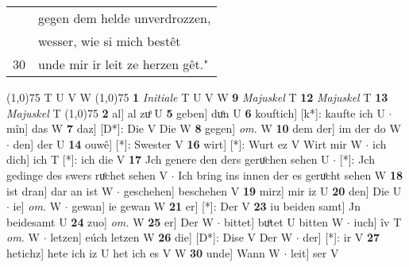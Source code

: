 \documentclass[8pt,a4paper,notitlepage]{article}
\begin{document}
\begin{table}[ht]
\begin{minipage}[t]{0.5\linewidth}
\begin{tabular}{rl}
 & gegen dem helde unverdrozzen,\\ 
 & wesser, wie si mich bestêt\\ 
30 & unde mir ir leit ze herzen gêt."\\ 
\end{tabular}
\scriptsize
\line(1,0){75} \newline
T U V W \newline
\line(1,0){75} \newline
\textbf{1} \textit{Initiale} T U V W  \textbf{9} \textit{Majuskel} T  \textbf{12} \textit{Majuskel} T  \textbf{13} \textit{Majuskel} T  \newline
\line(1,0){75} \newline
\textbf{2} al] al zuͦ U \textbf{5} geben] duͦn U \textbf{6} kouftich] [k*]: kaufte ich U  $\cdot$ mîn] das W \textbf{7} daz] [D*]: Die V Die W \textbf{8} gegen] \textit{om.} W \textbf{10} dem der] im der do W  $\cdot$ den] der U \textbf{14} ouwê] [*]: Swester V \textbf{16} wirt] [*]: Wurt ez V Wirt mir W  $\cdot$ ich dich] ich T [*]: ich die V \textbf{17} Jch genere den ders geruͦchen sehen U  $\cdot$ [*]: Jch gedinge des swers ruͦchet sehen V  $\cdot$ Ich bring ins innen der es geruͦcht sehen W \textbf{18} ist dran] dar an ist W  $\cdot$ geschehen] beschehen V \textbf{19} mirz] mir iz U \textbf{20} den] Die U  $\cdot$ ie] \textit{om.} W  $\cdot$ gewan] ie gewan W \textbf{21} er] [*]: Der V \textbf{23} iu beiden samt] Jn beidesamt U \textbf{24} zuo] \textit{om.} W \textbf{25} er] Der W  $\cdot$ bittet] buͦtet U bitten W  $\cdot$ iuch] îv T \textit{om.} W  $\cdot$ letzen] eúch letzen W \textbf{26} die] [D*]: Dise V Der W  $\cdot$ der] [*]: ir V \textbf{27} hetichz] hete ich iz U het ich es V W \textbf{30} unde] Wann W  $\cdot$ leit] ser V \newline
\end{minipage}
\end{table}
\end{document}
